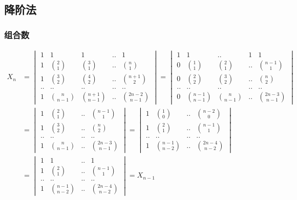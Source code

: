 \documentclass[12pt,a4paper]{ctexart}
\begin{document}
\subsection{降阶法}

\subsubsection{组合数}

\begin{align*}
    X_n &= \begin{vmatrix}
        1 & 1 & 1 & .. & 1 \\
        1 & \binom{2}{1} & \binom{3}{1} & .. & \binom{n}{1} \\
        1 & \binom{3}{2} & \binom{4}{2} & .. & \binom{n+1}{2} \\
        .. & .. & .. & .. & .. \\
        1 & \binom{n}{n-1} & \binom{n+1}{n-1} & .. & \binom{2n-2}{n-1}
    \end{vmatrix} =     \begin{vmatrix}
        1 & 1 & .. & 1 & 1\\
        0 & \binom{1}{1} &  \binom{2}{1} & .. & \binom{n-1}{1} \\
        0 & \binom{2}{2} & \binom{3}{2} & .. & \binom{n}{2}  \\
        .. & .. & .. & .. & ..\\
        0 & \binom{n-1}{n-1} & \binom{n}{n-1} & .. & \binom{2n-3}{n-1}
    \end{vmatrix} \\
    &=\begin{vmatrix}
          1 &  \binom{2}{1} & .. & \binom{n-1}{1} \\
          1 & \binom{3}{2} & .. & \binom{n}{2}  \\
          .. & .. & .. & ..\\
          1 & \binom{n}{n-1} & .. & \binom{2n-3}{n-1}
    \end{vmatrix} = \begin{vmatrix}
          1 &  \binom{1}{0} & .. & \binom{n-2}{0} \\
          1 & \binom{2}{1} & .. & \binom{n-1}{1}  \\
          .. & .. & .. & ..\\
          1 & \binom{n-1}{n-2} & .. & \binom{2n-4}{n-2}
    \end{vmatrix} \\
    & = \begin{vmatrix}
          1 &  1 & .. & 1 \\
          1 & \binom{2}{1} & .. & \binom{n-1}{1}  \\
          .. & .. & .. & ..\\
          1 & \binom{n-1}{n-2} & .. & \binom{2n-4}{n-2}
    \end{vmatrix} = X_{n-1}
\end{align*}
\end{document}
